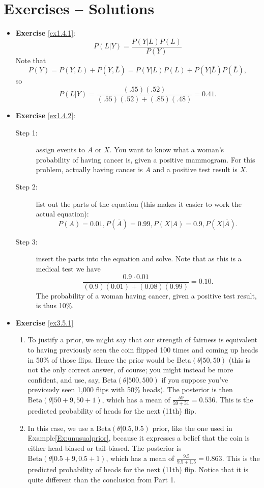 \section*{Exercises -- Solutions}
\begin{itemize}
	
\item \textbf{Exercise }\ref{ex1.4.1}:  
$$ P(L|Y) = \frac{P(Y|L) P(L)}{P(Y)}$$
Note that $$P(Y) = P(Y,L) + P(Y,\overline{L}) = P(Y|L) P(L) + P(Y|\overline{L}) P(\overline{L}),$$ so 
$$P(L|Y) =\frac{(.55)(.52)}{(.55)(.52)+(.85)(.48)} = 0.41.$$

\item \textbf{Exercise }\ref{ex1.4.2}: 
\begin{description}
\item[Step 1:] assign events to $A$ or $X$. You want to know what a woman's probability of having cancer is, given a positive mammogram. For this problem, actually having cancer is $A$ and a positive test result is $X$.
\item[Step 2:] list out the parts of the equation (this makes it easier to work the actual equation):
$$P(A) = 0.01, P(\overline{A})= 0.99, P(X|A)=0.9, P(X|\overline{A}).$$ 
\item[Step 3:] insert the parts into the equation and solve. Note that as this is a medical test we have
$$\frac{0.9\cdot 0.01}{(0.9)(0.01)+(0.08)(0.99)} = 0.10.$$ 
The probability of a woman having cancer, given a positive test result, is thus 10\%. 
\end{description}


\newpage\noindent\item \textbf{Exercise }\ref{ex3.5.1}
\begin{enumerate}
	\item To justify a prior, we might say that our strength of fairness is equivalent to having previously seen the coin flipped 100 times and coming up heads in 50\% of those flips. Hence the prior would be $\text{Beta}(\theta|50,50)$ (this is not the only correct answer, of course; you might instead be more confident, and use, say,  $\text{Beta}(\theta|500,500)$ if you suppose you've previously seen 1,000 flips with 50\% heads).\newl 
	The posterior is then $\text{Beta}(\theta|50+9,50+1)$, which has a mean of $\frac{59}{59+51} = 0.536$. This is the predicted probability of heads for the next (11th) flip.
\item In this case, we use a $\text{Beta}(\theta|0.5,0.5)$ prior, like the one used in Example\ref{Ex:unusualprior}, because it expresses a belief that the coin is either head-biased or tail-biased. \newl The posterior is  $\text{Beta}(\theta|0.5+9,0.5+1)$, which has a mean of $\frac{9.5}{9.5+1.5} = 0.863$. This is the predicted probability of heads for the next (11th) flip. Notice that it is quite different than the conclusion from Part 1.
\end{enumerate}



\end{itemize}
